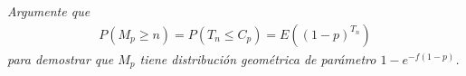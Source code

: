 \emph{
    Argumente que
    \begin{align}
        P(M_p\geq n)=P(T_n\leq C_p)=E((1-p)^{T_n})
    \end{align}
    para demostrar que $M_p$ tiene distribuci\'on geom\'etrica de par\'ametro $1-e^{-f(1-p)}$.
}
